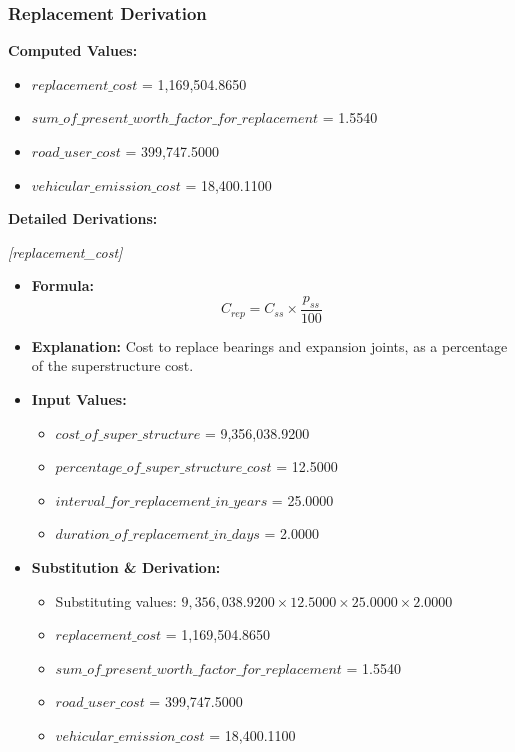 \documentclass[12pt,a4paper]{article}
\begin{document}
\subsubsection{Replacement Derivation}

\textbf{Computed Values:}

\begin{itemize}
  \item $replacement\_cost$ = 1,169,504.8650
  \item $sum\_of\_present\_worth\_factor\_for\_replacement$ = 1.5540
  \item $road\_user\_cost$ = 399,747.5000
  \item $vehicular\_emission\_cost$ = 18,400.1100
\end{itemize}

\textbf{Detailed Derivations:}


\textit{[replacement\_cost]}

\begin{itemize}
  \item \textbf{Formula:} $$C_{rep} = C_{ss} \times \frac{p_{ss}}{100}$$
  \item \textbf{Explanation:} Cost to replace bearings and expansion joints, as a percentage of the superstructure cost.
  \item \textbf{Input Values:}
  \begin{itemize}
    \item $cost\_of\_super\_structure$ = 9,356,038.9200
    \item $percentage\_of\_super\_structure\_cost$ = 12.5000
    \item $interval\_for\_replacement\_in\_years$ = 25.0000
    \item $duration\_of\_replacement\_in\_days$ = 2.0000
  \end{itemize}
  \item \textbf{Substitution \& Derivation:}
  \begin{itemize}
    \item Substituting values: $9,356,038.9200 \times 12.5000 \times 25.0000 \times 2.0000$
    \item $replacement\_cost$ = 1,169,504.8650
    \item $sum\_of\_present\_worth\_factor\_for\_replacement$ = 1.5540
    \item $road\_user\_cost$ = 399,747.5000
    \item $vehicular\_emission\_cost$ = 18,400.1100
  \end{itemize}
\end{itemize}
\end{document}
